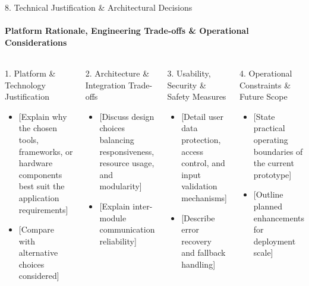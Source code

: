 \documentclass[aspectratio=169, 11pt]{beamer}
\begin{document}
\begin{frame}{8. Technical Justification \& Architectural Decisions}
    \framesubtitle{Platform Rationale, Engineering Trade-offs \& Operational Considerations}
    \begin{columns}[T]
        \begin{block}{1. Platform \& Technology Justification}
            \footnotesize
            \begin{itemize}
                \item {[Explain why the chosen tools, frameworks, or hardware components best suit the application requirements]}
                \item {[Compare with alternative choices considered]}
            \end{itemize}
        \end{block}

        \begin{block}{2. Architecture \& Integration Trade-offs}
            \footnotesize
            \begin{itemize}
                \item {[Discuss design choices balancing responsiveness, resource usage, and modularity]}
                \item {[Explain inter-module communication reliability]}
            \end{itemize}
        \end{block}

        \begin{block}{3. Usability, Security \& Safety Measures}
            \footnotesize
            \begin{itemize}
                \item {[Detail user data protection, access control, and input validation mechanisms]}
                \item {[Describe error recovery and fallback handling]}
            \end{itemize}
        \end{block}

        \begin{block}{4. Operational Constraints \& Future Scope}
            \footnotesize
            \begin{itemize}
                \item {[State practical operating boundaries of the current prototype]}
                \item {[Outline planned enhancements for deployment scale]}
            \end{itemize}
        \end{block}
    \end{columns}
\end{frame}
\end{document}
